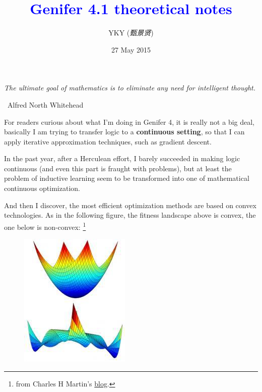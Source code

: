 \documentclass[12pt]{article}
\title{\textcolor{blue}{Genifer 4.1 theoretical notes}}
\author{YKY (\textit{甄景贤})}
\date{27 May 2015}
\newcommand{\tab}{\hspace*{1cm}}
\begin{document}
\tab\tab\tab \parbox{9cm}{\textit{The ultimate goal of mathematics is to eliminate any need for intelligent thought.}}
\begin{flushright}
\textemdash\, Alfred North Whitehead \hspace{1cm}
\end{flushright}

\sffamily

{\let\newpage\relax\maketitle}

\maketitle
\setlength{\parindent}{0em}
\setlength{\parskip}{1.5ex plus0.5ex minus1.2ex}

For readers curious about what I'm doing in Genifer 4, it is really not a big deal, basically I am trying to transfer logic to a \textbf{continuous setting}, so that I can apply iterative approximation techniques, such as gradient descent.

In the past year, after a Herculean effort, I barely succeeded in making logic continuous (and even this part is fraught with problems), but at least the problem of inductive learning seem to be transformed into one of mathematical continuous optimization.

And then I discover, the most efficient optimization methods are based on convex technologies.  As in the following figure, the fitness landscape above is convex, the one below is non-convex: \footnote{from Charles H Martin's \href{https://charlesmartin14.wordpress.com/2013/11/14/metric-learning-some-quantum-statistical-mechanics/}{blog}.}
\begin{figure}[H]
\centering
\includegraphics[scale=0.6]{convex-and-nonconvex.jpg}
\end{figure}
\end{document}
